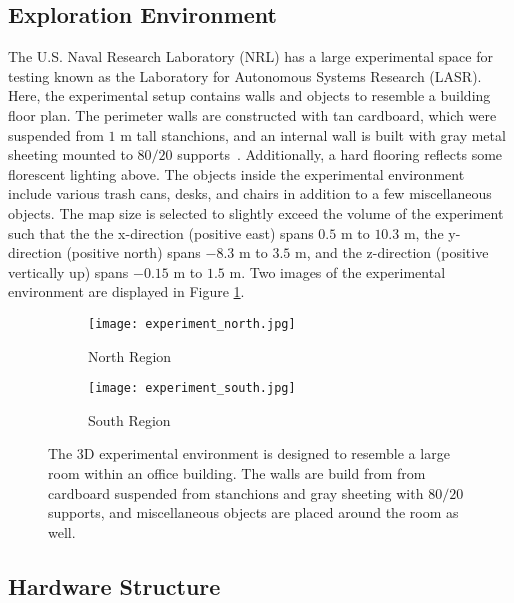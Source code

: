 \subsection{Exploration Environment}

The U.S. Naval Research Laboratory (NRL) has a large experimental space for testing known as the Laboratory for Autonomous Systems Research (LASR). Here, the experimental setup contains walls and objects to resemble a building floor plan. The perimeter walls are constructed with tan cardboard, which were suspended from $1$ m tall stanchions, and an internal wall is built with gray metal sheeting mounted to $80/20$ supports~\cite{url_8020}. Additionally, a hard flooring reflects some florescent lighting above. The objects inside the experimental environment include various trash cans, desks, and chairs in addition to a few miscellaneous objects. The map size is selected to slightly exceed the volume of the experiment such that the the x-direction (positive east) spans $0.5$ m to $10.3$ m, the y-direction (positive north) spans $-8.3$ m to $3.5$ m, and the z-direction (positive vertically up) spans $-0.15$ m to $1.5$ m. Two images of the experimental environment are displayed in Figure \ref{fig:exp3DEnvironment}.

\begin{figure}[!t]
\centering
    	\begin{subfigure}[t]{0.95\columnwidth}
           	\centering
          	\texttt{[image: experiment\_north.jpg]}
        		\caption{North Region}
    	\end{subfigure}
    	\begin{subfigure}[t]{0.95\columnwidth}
	\vspace*{0.03\columnwidth}
           	\centering
          	\texttt{[image: experiment\_south.jpg]}
        		\caption{South Region}
    	\end{subfigure}
	\caption{The 3D experimental environment is designed to resemble a large room within an office building. The walls are build from from cardboard suspended from stanchions and gray sheeting with $80/20$ supports, and miscellaneous objects are placed around the room as well.}
	\label{fig:exp3DEnvironment}
\end{figure}


\subsection{Hardware Structure}


